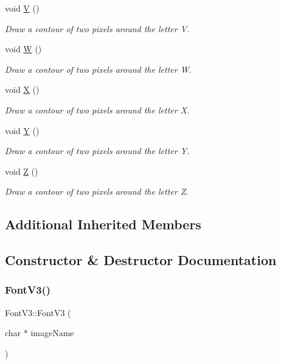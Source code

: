 \begin{DoxyCompactItemize}
void \mbox{\hyperlink{class_font_v3_aea95e65e5369e5c28f5867474ac4344a}{V}} ()
\begin{DoxyCompactList}\small\item\em Draw a contour of two pixels around the letter V. \end{DoxyCompactList}\item 
void \mbox{\hyperlink{class_font_v3_afc703bc984103ca4bb4837b063445df4}{W}} ()
\begin{DoxyCompactList}\small\item\em Draw a contour of two pixels around the letter W. \end{DoxyCompactList}\item 
void \mbox{\hyperlink{class_font_v3_ad5c0bbbf9004db4f4d55a337952c1ced}{X}} ()
\begin{DoxyCompactList}\small\item\em Draw a contour of two pixels around the letter X. \end{DoxyCompactList}\item 
void \mbox{\hyperlink{class_font_v3_a7043ca0266db871020697b760598f569}{Y}} ()
\begin{DoxyCompactList}\small\item\em Draw a contour of two pixels around the letter Y. \end{DoxyCompactList}\item 
void \mbox{\hyperlink{class_font_v3_a9f3a3741efc867b560459c8dc8b661ee}{Z}} ()
\begin{DoxyCompactList}\small\item\em Draw a contour of two pixels around the letter Z. \end{DoxyCompactList}\end{DoxyCompactItemize}
\subsection*{Additional Inherited Members}


\subsection{Constructor \& Destructor Documentation}
\mbox{\label{class_font_v3_a17489efd8fdb93bb48e5fcf22c2660c3}} 
\subsubsection{\texorpdfstring{Font\+V3()}{FontV3()}}
{\footnotesize\ttfamily Font\+V3\+::\+Font\+V3 (\begin{DoxyParamCaption}\item[{char $\ast$}]{image\+Name }\end{DoxyParamCaption})\hspace{0.3cm}{\ttfamily [inline]}}



